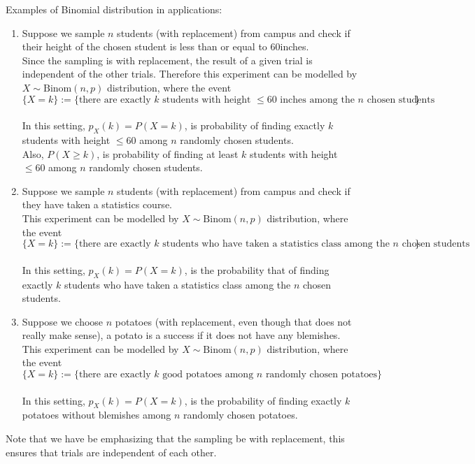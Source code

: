 Examples of Binomial distribution in applications:
\begin{enumerate}
    \item Suppose we sample $n$ students (with replacement) from campus and check if their height of the chosen student is less than or equal to 60inches. 
    \\
    Since the sampling is with replacement, the result of a given trial is independent of the other trials. Therefore this experiment can be modelled by $X\sim \text{Binom}(n, p)$ distribution, where the event 
    $$\{X= k \} := \{\text{there are exactly $k$ students with height $\le 60$ inches among the $n$ chosen students}\}$$
    \\
    In this setting, $p_X(k) = P(X=k)$, is probability of finding exactly $k$ students with height $\le 60$ among $n$ randomly chosen students. 
    \\
    Also, $P(X \ge k)$, is probability of finding at least  $k$ students with height $\le 60$ among $n$ randomly chosen students. 
    \item  Suppose we sample $n$ students (with replacement) from campus and check if they have taken a statistics course. 
    \\
    This experiment can be modelled by $X\sim \text{Binom}(n, p)$ distribution, where the event 
    $$\{X=k\} := \{\text{there are exactly $k$ students who have taken a statistics class among the $n$ chosen students}\}$$
    \\
    In this setting, $p_X(k) = P(X=k)$, is the probability that of finding exactly $k$ students who have taken a statistics class among the $n$ chosen students. 
    
    \item  Suppose we choose $n$ potatoes (with replacement, even though that does not really make sense), a potato is a success if it does not have any blemishes. 
    \\
    This experiment can be modelled by $X\sim \text{Binom}(n, p)$ distribution, where the event 
    $$\{X=k\} := \{\text{there are exactly $k$ good potatoes among $n$ randomly chosen potatoes}\}$$
    \\
    In this setting, $p_X(k) = P(X=k)$, is the probability of finding exactly $k$ potatoes without blemishes among $n$ randomly chosen potatoes. 
\end{enumerate}
Note that we have be emphasizing that the sampling be with replacement, this ensures that trials are independent of each other.
\\

